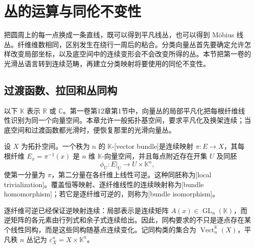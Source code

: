 
% 
% 

\section{丛的运算与同伦不变性}
\label{g2:sec:1901}

把圆周上的每一点换成一条直线，既可以得到平凡线丛，也可以得到 Möbius 线丛。纤维维数相同，区别发生在绕行一周后的粘合。分类向量丛首先要确定允许怎样改变局部坐标，以及底空间中的连续变形会不会改变所得的丛。本节把第一卷的光滑丛语言转到连续范畴，再建立分类映射将要使用的同伦不变性。

\subsection{过渡函数、拉回和丛同构}
\label{g2:subsec:1901:01}

以下 \(\mathbb K\) 表示 \(\mathbb R\) 或 \(\mathbb C\)。第一卷第12章第1节中，向量丛的局部平凡化把每根纤维线性识别为同一个向量空间。本章允许一般拓扑基空间，要求平凡化及换架连续；当底空间和过渡函数都光滑时，便恢复那里的光滑向量丛。

\begin{definition}\label{g2:def:topological-vector-bundle}
	设 \(X\) 为拓扑空间。一个秩为 \(n\) 的 \(\mathbb K\)-[vector bundle]是连续映射 \(\pi:E\to X\)，其每根纤维 \(E_x=\pi^{-1}(x)\) 是 \(n\) 维 \(\mathbb K\)-向量空间，并且每点附近存在开集 \(U\) 及同胚
	\[
		\phi_U:E|_U\longrightarrow U\times\mathbb K^n,
	\]
	使第一分量为 \(\pi\)，第二分量在各纤维上线性可逆。这种同胚称为[local trivialization]。覆盖恒等映射、逐纤维线性的连续映射称为[bundle homomorphism]；若它是逐纤维可逆的，则称为[bundle isomorphism]。
\end{definition}

逐纤维可逆已经保证逆映射连续：局部表示是连续矩阵 \(A(x)\in\operatorname{GL}_n(\mathbb K)\)，而逆矩阵的各元素由行列式和余子式连续给出。因此，同构要求的不只是逐点存在某个线性同构，而是这些同构随基点连续变化。记同构类的集合为 \(\operatorname{Vect}_n^{\mathbb K}(X)\)，平凡秩 \(n\) 丛记为 \(\varepsilon_X^n=X\times\mathbb K^n\)。

